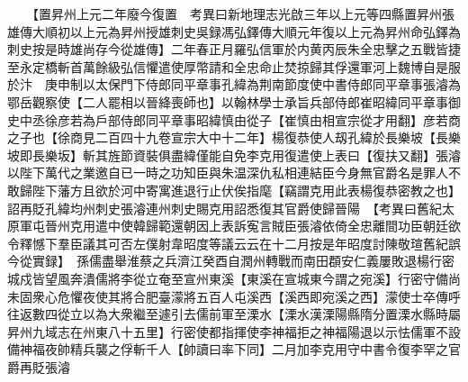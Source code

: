 　　【置昇州上元二年廢今復置　考異曰新地理志光啟三年以上元等四縣置昇州張雄傳大順初以上元為昇州授雄刺史吳録馮弘鐸傳大順元年復以上元為昇州命弘鐸為刺史按是時雄尚存今從雄傳】二年春正月羅弘信軍於内黄丙辰朱全忠擊之五戰皆捷至永定橋斬首萬餘級弘信懼遣使厚幣請和全忠命止焚掠歸其俘還軍河上魏博自是服於汴　庚申制以太保門下侍郎同平章事孔緯為荆南節度使中書侍郎同平章事張濬為鄂岳觀察使【二人罷相以晉絳喪師也】以翰林學士承旨兵部侍郎崔昭緯同平章事御史中丞徐彦若為戶部侍郎同平章事昭緯慎由從子【崔慎由相宣宗從才用翻】彦若商之子也【徐商見二百四十九卷宣宗大中十二年】楊復恭使人刼孔緯於長樂坡【長樂坡即長樂坂】斬其旌節資裝俱盡緯僅能自免李克用復遣使上表曰【復扶又翻】張濬以陛下萬代之業邀自已一時之功知臣與朱温深仇私相連結臣今身無官爵名是罪人不敢歸陛下藩方且欲於河中寄寓進退行止伏俟指麾【竊謂克用此表楊復恭密教之也】詔再貶孔緯均州刺史張濬連州刺史賜克用詔悉復其官爵使歸晉陽　【考異曰舊紀太原軍屯晉州克用遣中使韓歸範還朝因上表訴寃言賊臣張濬依倚全忠離間功臣朝廷欲令釋憾下羣臣議其可否左僕射韋昭度等議云云在十二月按是年昭度討陳敬瑄舊紀誤今從實録】　孫儒盡舉淮蔡之兵濟江癸酉自潤州轉戰而南田頵安仁義屢敗退楊行密城戍皆望風奔潰儒將李從立奄至宣州東溪【東溪在宣城東今謂之宛溪】行密守備尚未固衆心危懼夜使其將合肥臺濛將五百人屯溪西【溪西即宛溪之西】濛使士卒傳呼往返數四從立以為大衆繼至遽引去儒前軍至溧水【溧水漢溧陽縣隋分置溧水縣時屬昇州九域志在州東八十五里】行密使都指揮使李神福拒之神福陽退以示怯儒軍不設備神福夜帥精兵襲之俘斬千人【帥讀曰率下同】二月加李克用守中書令復李罕之官爵再貶張濬

